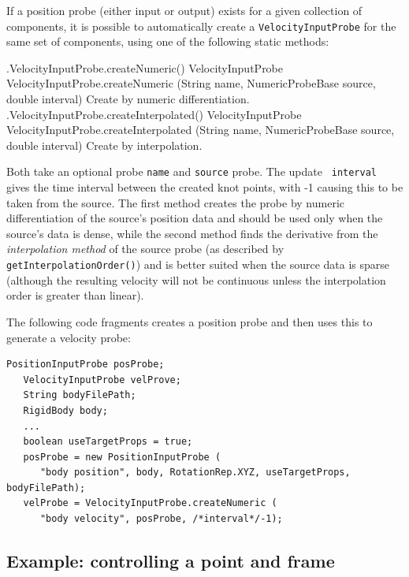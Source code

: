 If a position probe (either input or output) exists for a given collection of
components, it is possible to automatically create a {\tt VelocityInputProbe}
for the same set of components, using one of the following static methods:
%
\begin{methodtable}{0.65}{0.35}
\midline
%
\methodentry
{\probes.VelocityInputProbe.createNumeric()}%
{VelocityInputProbe VelocityInputProbe.createNumeric (String name,\brh 
NumericProbeBase source, double interval)}%
{Create by numeric differentiation.}%
%
\methodspace{0.5em}%
\methodentry
{\probes.VelocityInputProbe.createInterpolated()}%
{VelocityInputProbe VelocityInputProbe.createInterpolated (String name,\brh 
NumericProbeBase source, double interval)}%
{Create by interpolation.}%
%
\midline
\end{methodtable}
%
Both take an optional probe {\tt name} and {\tt source} probe. The update {\tt
interval} gives the time interval between the created knot points, with -1
causing this to be taken from the source. The first method creates the probe by
numeric differentiation of the source's position data and should be used only
when the source's data is dense, while the second method finds the derivative
from the {\it interpolation method} of the source probe (as described by {\tt
getInterpolationOrder()}) and is better suited when the source data is sparse
(although the resulting velocity will not be continuous unless the
interpolation order is greater than linear).

The following code fragments creates a position probe and then uses this to
generate a velocity probe:
%
\begin{lstlisting}[]
   PositionInputProbe posProbe;
   VelocityInputProbe velProve;
   String bodyFilePath;
   RigidBody body; 
   ...
   boolean useTargetProps = true;
   posProbe = new PositionInputProbe (
      "body position", body, RotationRep.XYZ, useTargetProps, bodyFilePath);
   velProbe = VelocityInputProbe.createNumeric (
      "body velocity", posProbe, /*interval*/-1);
\end{lstlisting}
%

\subsection{Example: controlling a point and frame}

